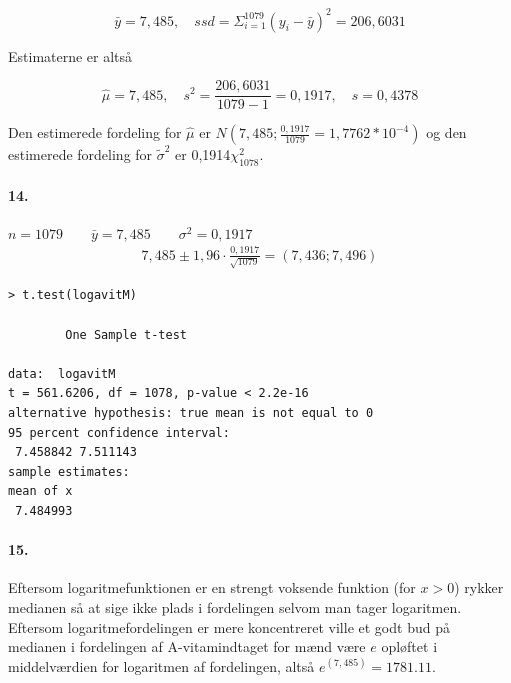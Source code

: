 \begin{equation*}
  \bar{y} = 7,485, \quad ssd = \Sigma^{1079}_{i=1}(y_i - \bar{y})^2 =
  206,6031
\end{equation*}

Estimaterne er altså

\begin{equation*}
  \hat{\mu} = 7,485, \quad s^2 = \frac{206,6031}{1079-1} = 0,1917, \quad
  s = 0,4378
\end{equation*}

Den estimerede fordeling for $\hat{\mu}$ er $N(7,485;
\frac{0,1917}{1079} = 1,7762 * 10^{-4})$ og den estimerede fordeling
for $\tilde{\sigma}^2$ er 0,1914$\chi^2_{1078}$.

\paragraph{14.} 
$n = 1079 \qquad \bar{y} = 7,485 \qquad \sigma^2 = 0,1917$
\begin{align*}
7,485 \pm 1,96 \cdot \frac{0,1917}{\sqrt{1079}} = (7,436 ; 7,496)
\end{align*}

\begin{verbatim}
> t.test(logavitM)

        One Sample t-test

data:  logavitM 
t = 561.6206, df = 1078, p-value < 2.2e-16
alternative hypothesis: true mean is not equal to 0 
95 percent confidence interval:
 7.458842 7.511143 
sample estimates:
mean of x 
 7.484993 
\end{verbatim}

\paragraph{15.}

Eftersom logaritmefunktionen er en strengt voksende funktion (for
$x>0$) rykker medianen så at sige ikke plads i fordelingen selvom man
tager logaritmen. Eftersom logaritmefordelingen er mere koncentreret
ville et godt bud på medianen i fordelingen af A-vitamindtaget for
mænd være $e$ opløftet i middelværdien for logaritmen af fordelingen,
altså $e^(7,485) = 1781.11$.
